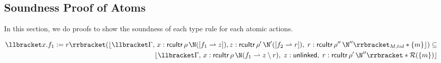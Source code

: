  \subsection{Soundness Proof of Atoms}
 \label{lem:lematom}
 In this section, we do proofs to show the soundness of each type rule for each atomic actions.
 \begin{lemma}\small
   \label{lemma:unlink}
\begin{align*}
  \llbracket x.f_1:=r \rrbracket (\lfloor \llbracket \Gamma, \, x:\mathsf{rcuItr}\,\rho\,\N ( [f_1 \rightharpoonup  z]), z:\mathsf{rcuItr} \, \rho' \,\N'([ f_2 \rightharpoonup r]), \;
  r:\mathsf{rcuItr} \, \rho'' \,\N'' \rrbracket_{M,tid} * \{m\}\rfloor)     \subseteq \\
                                                              \lfloor \llbracket \Gamma, \,  x:\mathsf{rcuItr} \, \rho \, \N( f_1 \rightharpoonup z \setminus r),\;
                                                              z:\mathsf{unlinked}, \;
                                                              r:\mathsf{rcuItr} \, \rho' \, \N'' \rrbracket  * \mathcal{R}(\{m\})\rfloor
\end{align*}
 \end{lemma}
